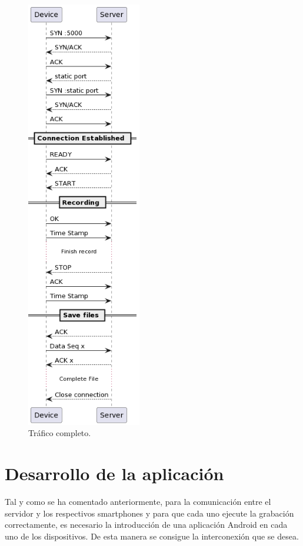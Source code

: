 \documentclass[a4paper,11pt]{book}
\begin{document}
	\begin{figure}[hbtp]
			\centering
			\includegraphics[width = 5cm]{FIGURAS/uml.png}
			\caption{Tráfico completo.}
			\end{figure}
					
			
			
			
			
\chapter{Desarrollo de la aplicación }

Tal y como se ha comentado anteriormente, para la comunicación entre el servidor y los respectivos smartphones y para que cada uno ejecute la grabación correctamente, es necesario la introducción de una aplicación Android en cada uno de los dispositivos. De esta manera se consigue la interconexión que se desea.
\end{document}
